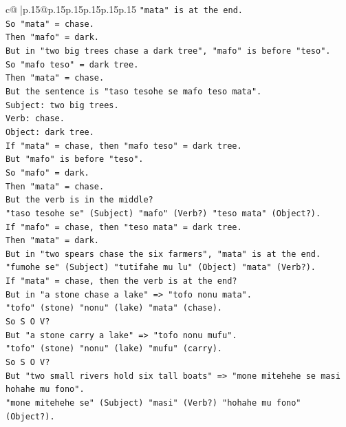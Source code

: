 \documentclass{article}
\begin{document}
{\begin{supertabular}{c@{$\;$}|p{.15\linewidth}@{}p{.15\linewidth}p{.15\linewidth}p{.15\linewidth}p{.15\linewidth}p{.15\linewidth}}
{{{\texttt{"mata" is at the end.} \\
\texttt{So "mata" = chase.} \\
\texttt{Then "mafo" = dark.} \\
\texttt{But in "two big trees chase a dark tree", "mafo" is before "teso".} \\
\texttt{So "mafo teso" = dark tree.} \\
\texttt{Then "mata" = chase.} \\
\texttt{But the sentence is "taso tesohe se mafo teso mata".} \\
\texttt{Subject: two big trees.} \\
\texttt{Verb: chase.} \\
\texttt{Object: dark tree.} \\
\texttt{If "mata" = chase, then "mafo teso" = dark tree.} \\
\texttt{But "mafo" is before "teso".} \\
\texttt{So "mafo" = dark.} \\
\texttt{Then "mata" = chase.} \\
\texttt{But the verb is in the middle?} \\
\texttt{"taso tesohe se" (Subject) "mafo" (Verb?) "teso mata" (Object?).} \\
\texttt{If "mafo" = chase, then "teso mata" = dark tree.} \\
\texttt{Then "mata" = dark.} \\
\texttt{But in "two spears chase the six farmers", "mata" is at the end.} \\
\texttt{"fumohe se" (Subject) "tutifahe mu lu" (Object) "mata" (Verb?).} \\
\texttt{If "mata" = chase, then the verb is at the end?} \\
\texttt{But in "a stone chase a lake" => "tofo nonu mata".} \\
\texttt{"tofo" (stone) "nonu" (lake) "mata" (chase).} \\
\texttt{So S O V?} \\
\texttt{But "a stone carry a lake" => "tofo nonu mufu".} \\
\texttt{"tofo" (stone) "nonu" (lake) "mufu" (carry).} \\
\texttt{So S O V?} \\
\texttt{But "two small rivers hold six tall boats" => "mone mitehehe se masi hohahe mu fono".} \\
\texttt{"mone mitehehe se" (Subject) "masi" (Verb?) "hohahe mu fono" (Object?).} \\
}}}
\end{supertabular}}
\end{document}
